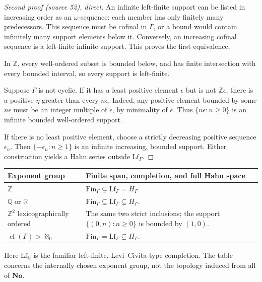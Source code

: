 \documentclass[11pt,letterpaper]{article}
\numberwithin{equation}{section}
\theoremstyle{definition}
\theoremstyle{remark}
\newcommand{\No}{\mathbf{No}}
\newcommand{\R}{\mathbb{R}}
\newcommand{\Q}{\mathbb{Q}}
\newcommand{\Z}{\mathbb{Z}}
\newcommand{\cf}{\operatorname{cf}}
\newcommand{\FinS}[1]{\mathrm{Fin}_{#1}}%
\newcommand{\LfS}[1]{\mathrm{Lf}_{#1}}%
\begin{document}
\begin{proof}[Second proof (source 52), direct]
An infinite left-finite support can be listed in increasing order as an $\omega$-sequence: each member has only finitely many predecessors. This sequence must be cofinal in $\Gamma$, or a bound would contain infinitely many support elements below it. Conversely, an increasing cofinal sequence is a left-finite infinite support. This proves the first equivalence.

In $\Z$, every well-ordered subset is bounded below, and has finite intersection with every bounded interval, so every support is left-finite.

Suppose $\Gamma$ is not cyclic. If it has a least positive element $\epsilon$ but is not $\Z\epsilon$, there is a positive $\eta$ greater than every $n\epsilon$. Indeed, any positive element bounded by some $n\epsilon$ must be an integer multiple of $\epsilon$, by minimality of $\epsilon$. Thus $\{n\epsilon:n\ge0\}$ is an infinite bounded well-ordered support.

If there is no least positive element, choose a strictly decreasing positive sequence $\epsilon_n$. Then $\{-\epsilon_n:n\ge1\}$ is an infinite increasing, bounded support. Either construction yields a Hahn series outside $\LfS{\Gamma}$.
\end{proof}

\begin{center}
\begin{tabularx}{\textwidth}{@{}lY@{}}
\toprule
Exponent group & Finite span, completion, and full Hahn space\\
\midrule
$\Z$ & $\FinS{\Gamma}\subsetneq \LfS{\Gamma}=H_\Gamma$.\\
$\Q$ or $\R$ & $\FinS{\Gamma}\subsetneq \LfS{\Gamma}\subsetneq H_\Gamma$.\\
$\Z^2$ lexicographically ordered & The same two strict inclusions; the support $\{(0,n):n\ge0\}$ is bounded by $(1,0)$.\\
$\cf(\Gamma)>\aleph_0$ & $\FinS{\Gamma}=\LfS{\Gamma}\subsetneq H_\Gamma$.\\
\bottomrule
\end{tabularx}
\end{center}
Here $\LfS{\Q}$ is the familiar left-finite, Levi--Civita-type completion. The table concerns the internally chosen exponent group, not the topology induced from all of $\No$.
\end{document}
